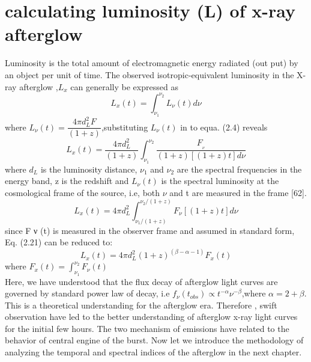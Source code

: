 \section{calculating luminosity (L) of x-ray afterglow}
Luminosity is the total amount of electromagnetic energy radiated (out put) by an  object per unit of time. The observed isotropic-equivalent luminosity in the X-ray afterglow ,$ L_{x} $ can generally be expressed as 
\begin{equation}
L_{x}(t)= \int_{\nu_{1}}^{\nu_{2}} L_{\nu}(t)d\nu
\end{equation}
 where $ L_{\nu}(t)=\dfrac{4 \pi d_{L}^{2} F}{(1+z)} $,substituting  $L_{\nu}(t)$ in to equa. (2.4) reveals 
 \begin{equation}
 L_{x}(t)=\dfrac{4 \pi d_{L}^{2}}{(1+z)}\int_{\nu_{1}}^{\nu_{2}}\frac{F_{_{\nu}}}{(1+z)[(1+z)t]d\nu} 
 \end{equation}
where $ d_{L} $ is the luminosity distance, $\nu_{1}$  and $ \nu_{2} $ are the spectral frequencies in the energy band, z is the redshift and $ L_{\nu}  (t) $ is the spectral luminosity at the cosmological frame of the source, i.e, both $\nu $ and t are  measured in the frame [62].
\begin{equation}
L_{x}(t) = 4\pi d_{L}^{2}\int_{\nu_{1}/(1+z)}^{\nu_{2}/(1+z)}F_{\nu}[(1+z)t]d\nu
\end{equation}
since F ν (t) is measured in the observer frame and assumed in standard form, Eq.
(2.21) can be reduced to:
\begin{equation}
L_{x}(t) = 4\pi d_{L}^{2}(1+z)^{(\beta-\alpha -1)} F_{x}(t)
\end{equation}
where $ F_{x}(t)  = \int _{\nu_{1}} ^{\nu_{2}}F_{\nu}(t)$ \\
Here, we have understood that the flux decay of afterglow light curves are governed by standard power law of decay, i.e $ f _{\nu}(t_{obs})  \propto t^{-\alpha} \nu^{-\beta} $,where $ \alpha = 2+\beta $. This is a theoretical understanding for the afterglow era. Therefore , swift observation have led to the better understanding of afterglow  x-ray light curves for the initial few hours. The two mechanism of emissions have related to the behavior of central engine of the burst. Now let we introduce the methodology of analyzing the temporal and spectral indices of the afterglow in the next chapter.

